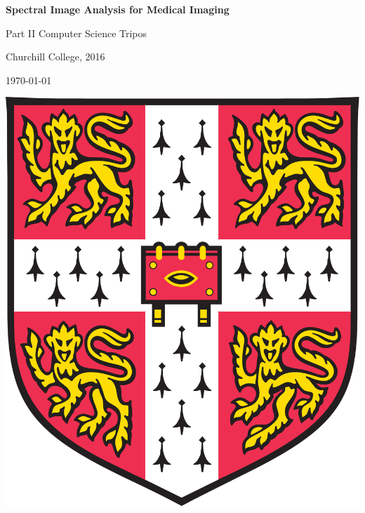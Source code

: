 \documentclass[12pt,twoside,notitlepage]{report}
\begin{document}
\begin{center}
    \vfill

    \Huge{\bf Spectral Image Analysis for Medical Imaging}
    
    \bigskip
    \bigskip
    
    {Part II Computer Science Tripos} \\
    
    \bigskip
    
    {Churchill College, 2016\\}

    \bigskip 

    {\today}

    \bigskip

    \includegraphics[scale=0.099]{titleimg/camcrest}

\end{center}
\end{document}

